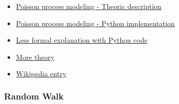 \documentclass{article}
\begin{document}
\begin{itemize}
  \item \href{https://www.probabilitycourse.com/chapter11/11_1_2_basic_concepts_of_the_poisson_process.php}{Poisson process modeling - Theoric description}
  \item \href{https://www.probabilitycourse.com/chapter14/Chapter_14.pdf}{Poisson process modeling - Python implementation}
  \item \href{https://timeseriesreasoning.com/contents/poisson-process/}{Less formal explanation with Python code}
  \item \href{https://www.math.wsu.edu/faculty/genz/416/lect/l05-45.pdf}{More theory}
  \item \href{https://en.wikipedia.org/wiki/Poisson_point_process}{Wikipedia entry}
\end{itemize}

\subsubsection{Random Walk}
\end{document}
